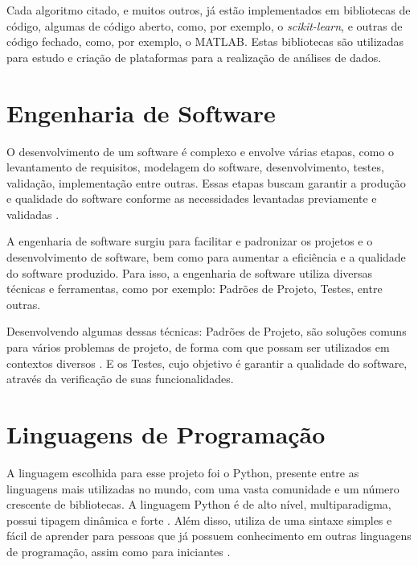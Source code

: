     \setlength{\leftskip}{3cm}

        Cada algoritmo citado, e muitos outros, já estão implementados em bibliotecas de código, algumas de código aberto, como, por exemplo, o \textit{scikit-learn}, e outras de código fechado, como, por exemplo, o MATLAB. Estas bibliotecas são utilizadas para estudo e criação de plataformas para a realização de análises de dados.

    \setlength{\leftskip}{0pt}

    \section{Engenharia de Software}

    O desenvolvimento de um software é complexo e envolve várias etapas, como o levantamento de requisitos, modelagem do software, desenvolvimento, testes, validação, implementação entre outras. Essas etapas buscam garantir a produção e qualidade do software conforme as necessidades levantadas previamente e validadas \cite{pressman2021engenharia}.

    A engenharia de software surgiu para facilitar e padronizar os projetos e o desenvolvimento de software, bem como para aumentar a eficiência e a qualidade do software produzido. Para isso, a engenharia de software utiliza diversas técnicas e ferramentas, como por exemplo: Padrões de Projeto, Testes, entre outras.

    Desenvolvendo algumas dessas técnicas: Padrões de Projeto, são soluções comuns para vários problemas de projeto, de forma com que possam ser utilizados em contextos diversos \cite{pressman2021engenharia}. E os Testes, cujo objetivo é garantir a qualidade do software, através da verificação de suas funcionalidades.

    \section{Linguagens de Programação}

    A linguagem escolhida para esse projeto foi o Python, presente entre as linguagens mais utilizadas no mundo, com uma vasta comunidade e um número crescente de bibliotecas. A linguagem Python é de alto nível, multiparadigma, possui tipagem dinâmica e forte \cite{python2022}. Além disso, utiliza de uma sintaxe simples e fácil de aprender para pessoas que já possuem conhecimento em outras linguagens de programação, assim como para iniciantes \cite{van1995python}.

